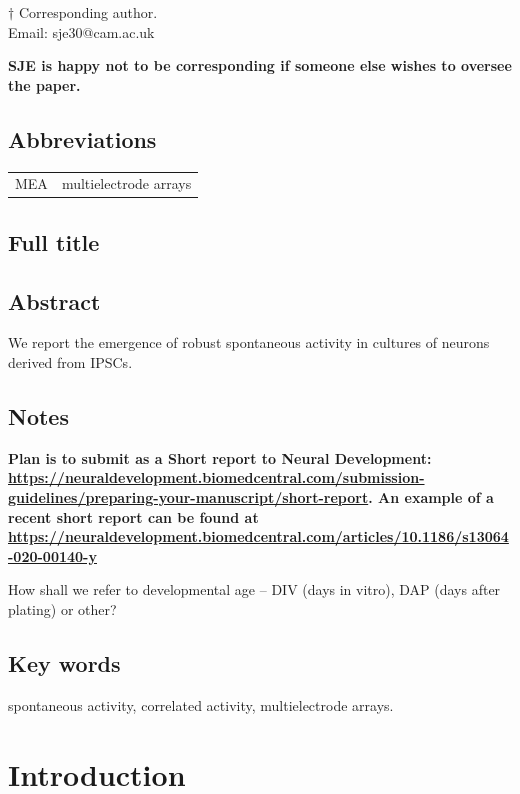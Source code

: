 \documentclass[11pt]{article}
\begin{document}
\noindent $\dagger$
Corresponding author.\\
\noindent Email: sje30@cam.ac.uk  {\textbf{SJE is happy not to be
    corresponding if someone else wishes to oversee the paper.}

\vspace*{2cm}
\subsection*{Abbreviations}
\begin{tabular}{ll}
MEA & multielectrode arrays\\
\end{tabular}

\clearpage

\subsection*{Full title}

\thetitle


\subsection*{Abstract}

We report the emergence of robust spontaneous activity in cultures of
neurons derived from IPSCs.



\subsection*{Notes}

\textbf{Plan is to submit as a Short report to Neural Development:
  \url{https://neuraldevelopment.biomedcentral.com/submission-guidelines/preparing-your-manuscript/short-report}.
  An example of a recent short report can be found at 
\url{https://neuraldevelopment.biomedcentral.com/articles/10.1186/s13064-020-00140-y}}

How shall we refer to developmental age -- DIV (days in vitro), DAP
(days after plating) or other?



\subsection*{Key words} spontaneous activity, correlated activity,
multielectrode arrays.


\clearpage
\section*{Introduction}


}
\end{document}
